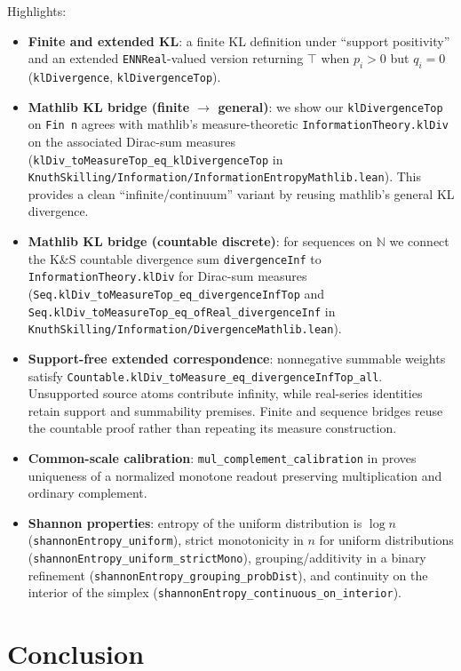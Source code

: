 \documentclass[11pt]{article}
\theoremstyle{definition}
\theoremstyle{remark}
\begin{document}
Highlights:
\begin{itemize}
\item \textbf{Finite and extended KL}: a finite KL definition under ``support positivity'' and an extended
  \texttt{ENNReal}-valued version returning $\top$ when $p_i>0$ but $q_i=0$
  (\texttt{klDivergence}, \texttt{klDivergenceTop}).
\item \textbf{Mathlib KL bridge (finite $\to$ general)}: we show our \texttt{klDivergenceTop} on \texttt{Fin n}
  agrees with mathlib's measure-theoretic \texttt{InformationTheory.klDiv} on the associated Dirac-sum measures
  (\texttt{klDiv\_toMeasureTop\_eq\_klDivergenceTop} in
  \texttt{KnuthSkilling/Information/InformationEntropyMathlib.lean}).
  This provides a clean ``infinite/continuum'' variant by reusing mathlib's general KL divergence.
\item \textbf{Mathlib KL bridge (countable discrete)}: for sequences on $\mathbb{N}$ we connect the K\&S
  countable divergence sum \texttt{divergenceInf} to \texttt{InformationTheory.klDiv} for Dirac-sum measures
  (\texttt{Seq.klDiv\_toMeasureTop\_eq\_divergenceInfTop} and
  \texttt{Seq.klDiv\_toMeasureTop\_eq\_ofReal\_divergenceInf} in
  \texttt{KnuthSkilling/Information/DivergenceMathlib.lean}).
\item \textbf{Support-free extended correspondence}: nonnegative summable weights
  satisfy \texttt{Countable.klDiv\_toMeasure\_eq\_divergenceInfTop\_all}.
  Unsupported source atoms contribute infinity, while real-series identities
  retain support and summability premises. Finite and sequence bridges reuse
  the countable proof rather than repeating its measure construction.
\item \textbf{Common-scale calibration}: \texttt{mul\_complement\_calibration}
  in  proves uniqueness of a
  normalized monotone readout preserving multiplication and ordinary complement.
\item \textbf{Shannon properties}: entropy of the uniform distribution is $\log n$
  (\texttt{shannonEntropy\_uniform}), strict monotonicity in $n$ for uniform distributions
  (\texttt{shannonEntropy\_uniform\_strictMono}), grouping/additivity in a binary refinement
  (\texttt{shannonEntropy\_grouping\_probDist}), and continuity on the interior of the simplex
  (\texttt{shannonEntropy\_continuous\_on\_interior}).
\end{itemize}

\section{Conclusion}
\end{document}
